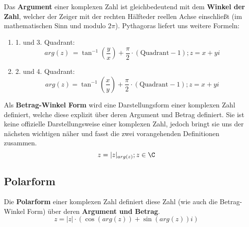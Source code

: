 \documentclass[main.tex]{subfiles}
\begin{document}
		\begin{Definition}
			Das \textbf{Argument} einer komplexen Zahl ist gleichbedeutend mit dem \textbf{Winkel der Zahl}, welcher der Zeiger mit der \glqq rechten Hälfte\grqq der reellen Achse einschließt (im mathematischen Sinn und modulo $2\pi$). Pythagoras liefert uns weitere Formeln:

			\begin{enumerate}
				\item 1. und 3. Quadrant: $$arg(z) \:= \tan^{-1}\left(\dfrac{y}{x}\right) + \dfrac{\pi}{2} \cdot (\text{Quadrant} - 1) ; z = x + yi$$
				\item 2. und 4. Quadrant: $$arg(z) = \tan^{-1}\left(\dfrac{x}{y}\right) + \dfrac{\pi}{2} \cdot (\text{Quadrant} - 1) ; z = x + yi$$
			\end{enumerate}

		\end{Definition}

		\begin{Definition}
			Als \textbf{Betrag-Winkel Form} wird eine Darstellungsform einer komplexen Zahl definiert, welche diese explizit über deren Argument und Betrag definiert. Sie ist keine offizielle Darstellungsweise einer komplexen Zahl, jedoch bringt sie uns der nächsten wichtigen näher und fasst die zwei vorangehenden Definitionen zusammen.
													$$z = |z|_{arg(z)}; z \in \C$$
		\end{Definition}

	\subsection{Polarform}

		\begin{Definition}[Polarform]
			Die \textbf{Polarform} einer komplexen Zahl definiert diese Zahl (wie auch die Betrag-Winkel Form) über deren \textbf{Argument und Betrag}.
													$$z = |z| \cdot (\cos(arg(z)) + \sin(arg(z))i)$$
		\end{Definition}
\end{document}
